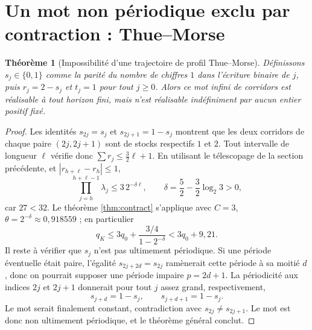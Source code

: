 \documentclass[11pt,a4paper]{article}
\newtheorem{theoreme}{Théorème}[section]
\begin{document}
\section{Un mot non périodique exclu par contraction : Thue--Morse}
\begin{theoreme}[Impossibilité d'une trajectoire de profil Thue--Morse]\label{thm:thue}
Définissons $s_j\in\{0,1\}$ comme la parité du nombre de chiffres $1$ dans l'écriture binaire de $j$, puis $r_j=2-s_j$ et $t_j=1$ pour tout $j\ge0$. Alors ce mot infini de corridors est réalisable à tout horizon fini, mais n'est réalisable indéfiniment par aucun entier positif fixé.
\end{theoreme}
\begin{proof}
Les identités $s_{2j}=s_j$ et $s_{2j+1}=1-s_j$ montrent que les deux corridors de chaque paire $(2j,2j+1)$ sont de stocks respectifs $1$ et $2$. Tout intervalle de longueur $\ell$ vérifie donc $\sum r_j\le\frac32\ell+1$. En utilisant le télescopage de la section précédente, et $|r_{h+\ell}-r_h|\le1$,
\[
\prod_{j=h}^{h+\ell-1}\lambda_j\le
3\,2^{-\delta\ell},\qquad
\delta=\frac52-\frac32\log_2 3>0,
\]
car $27<32$. Le théorème \ref{thm:contract} s'applique avec $C=3$, $\theta=2^{-\delta}\approx0{,}918559$ ; en particulier
\[
q_K\le3q_0+\frac{3/4}{1-2^{-\delta}}<3q_0+9{,}21.
\]
Il reste à vérifier que $s_j$ n'est pas ultimement périodique. Si une période éventuelle était paire, l'égalité $s_{2j+2d}=s_{2j}$ ramènerait cette période à sa moitié $d$, donc on pourrait supposer une période impaire $p=2d+1$. La périodicité aux indices $2j$ et $2j+1$ donnerait pour tout $j$ assez grand, respectivement,
\[
s_{j+d}=1-s_j,\qquad s_{j+d+1}=1-s_j.
\]
Le mot serait finalement constant, contradiction avec $s_{2j}\ne s_{2j+1}$. Le mot est donc non ultimement périodique, et le théorème général conclut.
\end{proof}
\end{document}
